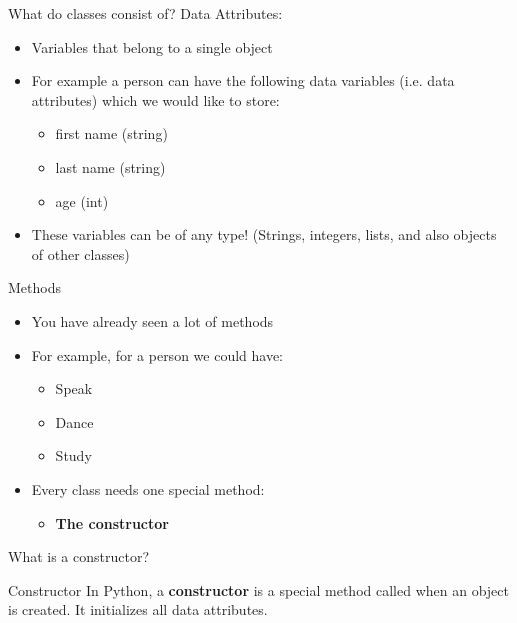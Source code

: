 \begin{frame}{What do classes consist of?}
    \pause
    Data Attributes:
    \begin{itemize}
        \pause
        \item Variables that belong to a single object
        \pause
        \item For example a person can have the following data variables (i.e. data attributes) which we would like to store:
        \pause
        \begin{itemize}
            \item first name (string)
            \item last name (string)
            \item age (int)
        \end{itemize}
        \pause
        \item These variables can be of any type! (Strings, integers, lists, and also objects of other classes)
    \end{itemize}
\end{frame}

\begin{frame}{Methods}
\begin{itemize}
    \item You have already seen a lot of methods
    \pause
    \item For example, for a person we could have:
    \begin{itemize}
        \pause
        \item Speak
        \item Dance
        \item Study
    \end{itemize}
    \pause
    \item Every class needs one special method:
    \begin{itemize}
        \pause
        \item \textbf{The constructor}
    \end{itemize}
\end{itemize}
\end{frame}

\begin{frame}{What is a constructor?}
\pause
\begin{block}{Constructor}
In Python, a \textbf{constructor} is a special method called when an object is created. It initializes all data attributes.
\end{block}
\end{frame}

